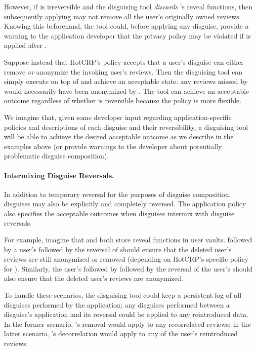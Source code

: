 However, if \ca is irreversible and the disguising tool \emph{discards} \ca's reveal functions, then
subsequently applying \gdpr may not remove all the user's originally owned reviews. Knowing this
beforehand, the tool could,
before applying any disguise, provide a warning to the application developer that the privacy policy may be violated if \gdpr is
applied after \ca.

Suppose instead that HotCRP's policy accepts that a user's \gdpr disguise can either remove \emph{or}
anonymize the invoking user's reviews. Then the disguising tool can simply execute \gdpr on top of
\ca and achieve an acceptable state: any reviews missed by \gdpr would necessarily have been
anonymized by \ca.  The tool can achieve an acceptable outcome regardless of whether \ca is
reversible because the policy is more flexible.

We imagine that, given some developer input regarding application-specific policies and descriptions
of each disguise and their reversibility, a disguising tool will be able to achieve the desired acceptable
outcome as we describe in the examples above (or provide warnings to the developer about potentially
problematic disguise composition).

\paragraph{Intermixing Disguise Reversals.}
In addition to temporary reversal for the purposes of disguise composition, disguises may also be
explicitly and completely reversed. 
The application policy also specifies the acceptable outcomes when disguises intermix with disguise reversals.

For example, imagine that \ca and \gdpr both store reveal functions in user vaults. 
%
\ca followed by a user's \gdpr followed by the reversal of \ca should ensure that the deleted user's
reviews are still anonymized or removed (depending on HotCRP's specific policy for \gdpr).
Similarly, the user's \gdpr followed by \ca followed by the reversal of the user's \gdpr should also
ensure that the deleted user's reviews are anonymized.

To handle these scenarios, the disguising tool could keep a persistent log of all disguises
performed by the application; any disguises performed between a disguise's application and its
reversal could be applied to any reintroduced data. In the former scenario, \gdpr's removal would
apply to any recorrelated reviews; in the latter scenario, \ca's decorrelation would apply to any of
the user's reintroduced reviews.
